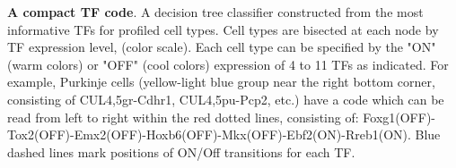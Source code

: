 \textbf{A compact TF code}. A decision tree classifier constructed from the most informative TFs for profiled cell types. Cell types are bisected at each node by TF expression level, (color scale). Each cell type can be specified by the "ON" (warm colors) or "OFF" (cool colors) expression of 4 to 11 TFs as indicated. For example, Purkinje cells  (yellow-light blue group near the right bottom corner, consisting of CUL4,5gr-Cdhr1, CUL4,5pu-Pcp2, etc.) have a code which can be read from left to right within the red dotted lines, consisting of: Foxg1(OFF)-Tox2(OFF)-Emx2(OFF)-Hoxb6(OFF)-Mkx(OFF)-Ebf2(ON)-Rreb1(ON). Blue dashed lines mark positions of ON/Off transitions for each TF. 


